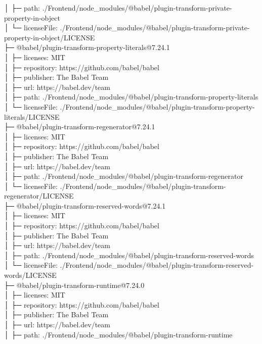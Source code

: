 │  ├─ path: ./Frontend/node\_modules/@babel/plugin-transform-private-property-in-object\\
│  └─ licenseFile: ./Frontend/node\_modules/@babel/plugin-transform-private-property-in-object/LICENSE\\
├─ @babel/plugin-transform-property-literals@7.24.1\\
│  ├─ licenses: MIT\\
│  ├─ repository: https://github.com/babel/babel\\
│  ├─ publisher: The Babel Team\\
│  ├─ url: https://babel.dev/team\\
│  ├─ path: ./Frontend/node\_modules/@babel/plugin-transform-property-literals\\
│  └─ licenseFile: ./Frontend/node\_modules/@babel/plugin-transform-property-literals/LICENSE\\
├─ @babel/plugin-transform-regenerator@7.24.1\\
│  ├─ licenses: MIT\\
│  ├─ repository: https://github.com/babel/babel\\
│  ├─ publisher: The Babel Team\\
│  ├─ url: https://babel.dev/team\\
│  ├─ path: ./Frontend/node\_modules/@babel/plugin-transform-regenerator\\
│  └─ licenseFile: ./Frontend/node\_modules/@babel/plugin-transform-regenerator/LICENSE\\
├─ @babel/plugin-transform-reserved-words@7.24.1\\
│  ├─ licenses: MIT\\
│  ├─ repository: https://github.com/babel/babel\\
│  ├─ publisher: The Babel Team\\
│  ├─ url: https://babel.dev/team\\
│  ├─ path: ./Frontend/node\_modules/@babel/plugin-transform-reserved-words\\
│  └─ licenseFile: ./Frontend/node\_modules/@babel/plugin-transform-reserved-words/LICENSE\\
├─ @babel/plugin-transform-runtime@7.24.0\\
│  ├─ licenses: MIT\\
│  ├─ repository: https://github.com/babel/babel\\
│  ├─ publisher: The Babel Team\\
│  ├─ url: https://babel.dev/team\\
│  ├─ path: ./Frontend/node\_modules/@babel/plugin-transform-runtime\\
